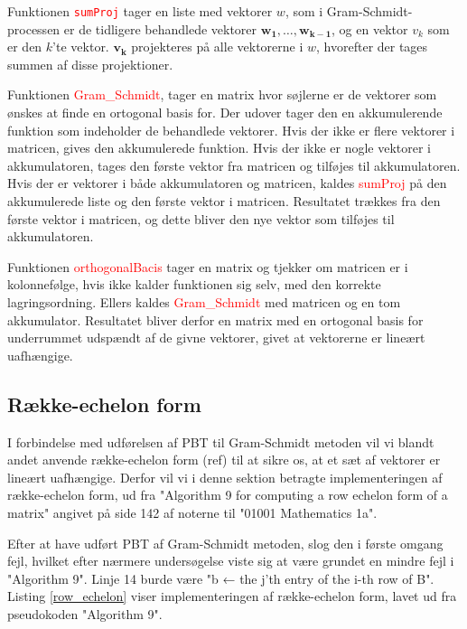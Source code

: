 Funktionen \textcolor{red}{\texttt{sumProj}} tager en liste med vektorer \(w\), som i Gram-Schmidt-processen er de tidligere behandlede vektorer \(\mathbf{w_1}, \ldots, \mathbf{w_{k-1}}\), og en vektor \(v_k\) som er den \(k\)'te vektor. $\mathbf{v_k}$ projekteres på alle vektorerne i \(w\), hvorefter der tages summen af disse projektioner.

Funktionen \textcolor{red}{Gram\_Schmidt}, tager en matrix hvor søjlerne er de vektorer som ønskes at finde en ortogonal basis for. Der udover tager den en akkumulerende funktion som indeholder de behandlede vektorer. Hvis der ikke er flere vektorer i matricen, gives den akkumulerede funktion. Hvis der ikke er nogle vektorer i akkumulatoren, tages den første vektor fra matricen og tilføjes til akkumulatoren. Hvis der er vektorer i både akkumulatoren og matricen, kaldes \textcolor{red}{sumProj} på den akkumulerede liste og den første vektor i matricen. Resultatet trækkes fra den første vektor i matricen, og dette bliver den nye vektor som tilføjes til akkumulatoren. 

Funktionen \textcolor{red}{orthogonalBacis} tager en matrix og tjekker om matricen er i kolonnefølge, hvis ikke kalder funktionen sig selv, med den korrekte lagringsordning. Ellers kaldes \textcolor{red}{Gram\_Schmidt} med matricen og en tom akkumulator. Resultatet bliver derfor en matrix med en ortogonal basis for underrummet udspændt af de givne vektorer, givet at vektorerne er lineært uafhængige.

\subsection{Række-echelon form}
I forbindelse med udførelsen af PBT til Gram-Schmidt metoden vil vi blandt andet anvende række-echelon form (ref) til at sikre os, at et sæt af vektorer er lineært uafhængige. Derfor vil vi i denne sektion betragte implementeringen af række-echelon form, ud fra "Algorithm 9 for computing a row echelon form of a matrix" angivet på side 142 af noterne til "01001 Mathematics 1a". 

Efter at have udført PBT af Gram-Schmidt metoden, slog den i første omgang fejl, hvilket efter nærmere undersøgelse viste sig at være grundet en mindre fejl i "Algorithm 9". Linje 14 burde være "b ← the j'th entry of the i-th row of B".  Listing \ref{row_echelon} viser implementeringen af række-echelon form, lavet ud fra pseudokoden "Algorithm 9".

